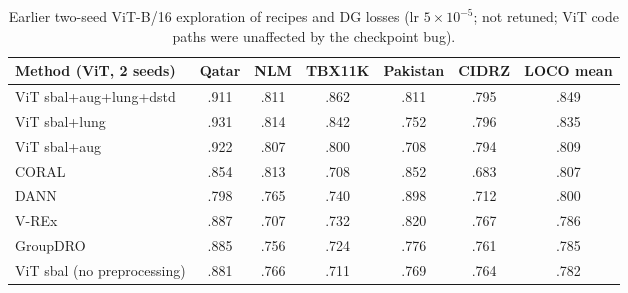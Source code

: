 \documentclass[10pt,a4paper]{article}
\begin{document}
\begin{table}[H]\centering\footnotesize
\begin{tabular}{lcccccc}\toprule
Method (ViT, 2 seeds) & Qatar & NLM & TBX11K & Pakistan & CIDRZ & LOCO mean\\\midrule
ViT sbal+aug+lung+dstd & .911 & .811 & .862 & .811 & .795 & .849\\
ViT sbal+lung & .931 & .814 & .842 & .752 & .796 & .835\\
ViT sbal+aug & .922 & .807 & .800 & .708 & .794 & .809\\
CORAL & .854 & .813 & .708 & .852 & .683 & .807\\
DANN & .798 & .765 & .740 & .898 & .712 & .800\\
V-REx & .887 & .707 & .732 & .820 & .767 & .786\\
GroupDRO & .885 & .756 & .724 & .776 & .761 & .785\\
ViT sbal (no preprocessing) & .881 & .766 & .711 & .769 & .764 & .782\\\bottomrule
\end{tabular}\caption{Earlier two-seed ViT-B/16 exploration of recipes and DG losses (lr $5\times10^{-5}$; not retuned; ViT code paths were unaffected by the checkpoint bug).}\label{tab:dg}\end{table}
\end{document}
